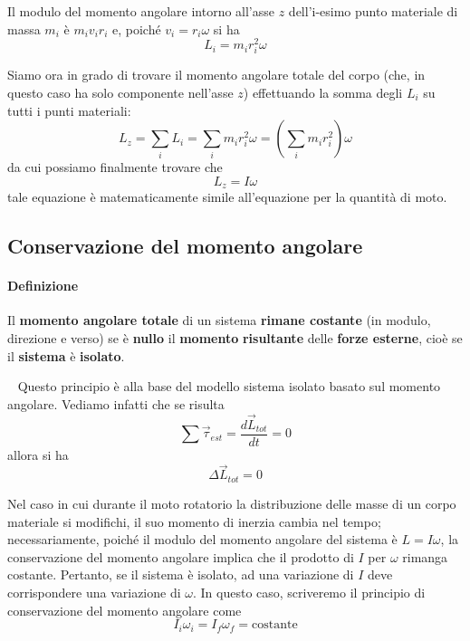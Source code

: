 \documentclass[a4paper,11pt,oneside]{book}
\begin{document}
Il modulo del momento angolare intorno all’asse $z$ dell’i-esimo punto materiale di massa $m_i$ è $m_iv_ir_i$ e, poiché $v_i = r_i\omega$ si ha
\begin{equation*}
    L_i = m_ir_i^2 \omega
\end{equation*}

Siamo ora in grado di trovare il momento angolare totale del corpo (che, in questo caso ha solo componente nell'asse $z$)
effettuando la somma degli $L_i$ su tutti i punti materiali:
\begin{equation*}
    L_z = \sum_i L_i = \sum_i m_ir_i^2 \omega = \left(\sum_i m_ir_i^2 \right) \omega
\end{equation*}
da cui possiamo finalmente trovare che
\begin{equation*}
    L_z = I\omega
\end{equation*}
tale equazione è matematicamente simile all'equazione per la quantità di moto.

\subsection{Conservazione del momento angolare}
\paragraph{Definizione} 
Il \textbf{momento angolare totale} di un sistema \textbf{rimane costante} (in modulo, direzione e verso) se è \textbf{nullo} il \textbf{momento} 
\textbf{risultante} delle \textbf{forze esterne}, cioè se il \textbf{sistema} è \textbf{isolato}.

~\newline
Questo principio è alla base del modello sistema isolato basato sul momento angolare. Vediamo infatti che se risulta
\begin{equation*}
    \sum \vec{\tau}_{est} = \frac{d\vec{L}_{tot}}{dt} = 0
\end{equation*}
allora si ha
\begin{equation*}
    \Delta \vec{L}_{tot} = 0
\end{equation*}

Nel caso in cui durante il moto rotatorio la distribuzione delle masse di un corpo materiale si modifichi, il suo momento 
di inerzia cambia nel tempo; necessariamente, poiché il modulo del momento angolare del sistema è $L = I\omega$, la conservazione
del momento angolare implica che il prodotto di $I$ per $\omega$ rimanga costante. Pertanto, se il sistema è isolato, ad una variazione di
$I$ deve corrispondere una variazione di $\omega$. In questo caso, scriveremo il principio di conservazione del momento angolare come
\begin{equation*}
    I_i\omega_i = I_f\omega_f = \text{costante}
\end{equation*}
\end{document}
